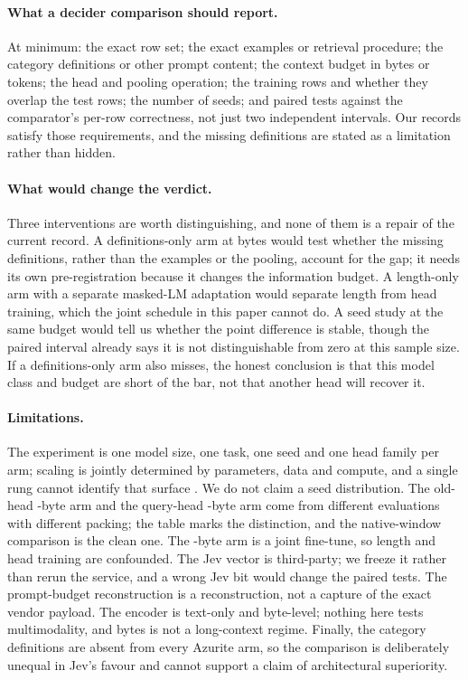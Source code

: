 \documentclass[11pt]{article}
\begin{document}
\paragraph{What a decider comparison should report.}
At minimum: the exact row set; the exact examples or retrieval procedure; the
category definitions or other prompt content; the context budget in bytes or
tokens; the head and pooling operation; the training rows and whether they
overlap the test rows; the number of seeds; and paired tests against the
comparator's per-row correctness, not just two independent intervals. Our
records satisfy those requirements, and the missing definitions are stated as a
limitation rather than hidden.

\paragraph{What would change the verdict.}
Three interventions are worth distinguishing, and none of them is a repair of
the current record. A definitions-only arm at \PSeq{} bytes would test whether
the missing \PLabels{} definitions, rather than the examples or the pooling,
account for the gap; it needs its own pre-registration because it changes the
information budget. A length-only arm with a separate masked-LM adaptation
would separate length from head training, which the joint schedule in this
paper cannot do. A seed study at the same budget would tell us whether the
\PQueryVsOldZero{} point difference is stable, though the paired interval
already says it is not distinguishable from zero at this sample size. If a
definitions-only arm also misses, the honest conclusion is that this model
class and budget are short of the bar, not that another head will recover it.

\paragraph{Limitations.}
The experiment is one model size, one task, one seed and one head family per
arm; scaling is jointly determined by parameters, data and compute, and a
single rung cannot identify that surface \citep{kaplan2020scaling,hoffmann2022chinchilla}.
We do not claim a seed distribution. The old-head \PSeq-byte arm and the
query-head \PSeq-byte arm come from different evaluations with different
packing; the table marks the distinction, and the native-window comparison is
the clean one. The \PSeq-byte arm is a joint fine-tune, so length and head
training are confounded. The Jev vector is third-party; we freeze it rather
than rerun the service, and a wrong Jev bit would change the paired tests. The
prompt-budget reconstruction is a reconstruction, not a capture of the exact
vendor payload. The encoder is text-only and byte-level; nothing here tests
multimodality, and \PSeq{} bytes is not a long-context regime. Finally, the
category definitions are absent from every Azurite arm, so the comparison is
deliberately unequal in Jev's favour and cannot support a claim of architectural
superiority.
\end{document}
